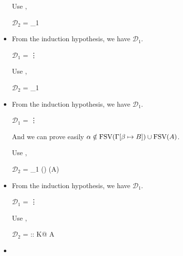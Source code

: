 \begin{itemize}
	      Use \KTW,
	      	      	      	      
	      $\mathcal{D}_2$ = 
	      {_1}
	      	      	      	      
	\item \KTWL
	      	      	      	      
	      From the induction hypothesis, we have $\mathcal{D}_1$.
	      	      	      	      
	      $\mathcal{D}_1$ = 
	      {\vdots}
	      	      	      	      
	      Use \KTWL,
	      	      	      	      
	      $\mathcal{D}_2$ = 
	      {_1}
	      	      	      	      
	\item \KGen
	      	      	      	      
	      From the induction hypothesis, we have $\mathcal{D}_1$.
	      	      	      	      
	      $\mathcal{D}_1$ = 
	      {\vdots}
	      	      	      	      
	      And we can prove easily $\alpha \notin \text{FSV}(\Gamma[\beta \mapsto B]) \cup \text{FSV}(A)$.
	      	      	      	      
	      Use \KGen,
	      	      	      	      
	      $\mathcal{D}_2$ = 
	      {_1 \andalso \alpha \notin \FTV(\GG) \cup \FTV(A)}
	      	      	      	      
	\item \KCsp
	      	      	      	      
	      From the induction hypothesis, we have $\mathcal{D}_1$.
	      	      	      	      
	      $\mathcal{D}_1$ = 
	      {\vdots}
	      	      	      	      
	      Use \KCsp,
	      	      	      	      
	      $\mathcal{D}_2$ = 
	      {\GGV \tau\SB :: K\SB @ A}
	      	      	      	      
	      \fi
	      	      	      	      
	\item \TVar
	      	      	      	      

\end{itemize}
